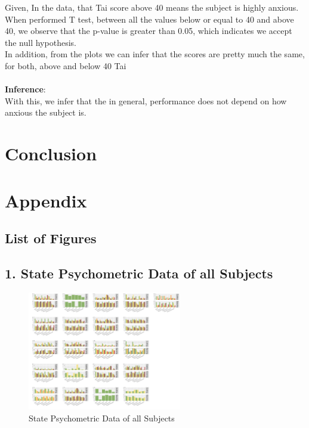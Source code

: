 \documentclass[12pt,epsf]{report}
\begin{document}
Given, In the data, that Tai score above 40 means the subject is highly anxious. When performed T test, between all the values below or equal to 40 and above 40, we observe that the p-value is greater than 0.05, which indicates we accept the null hypothesis.\\
In addition, from the plots we can infer that the scores are pretty much the same, for both, above and below 40 Tai\\
\\
\textbf{Inference}:\\
With this, we infer that the in general, performance does not depend on how anxious the subject is.
\FloatBarrier
\section*{Conclusion}



\newpage
\section*{Appendix}
\subsection*{List of Figures}
\subsection*{1. State Psychometric Data of all Subjects}
\begin{figure}[!htb]
	\centering
	\includegraphics[width=0.6\textwidth]{multiplot_state_psycho.pdf}
	\caption{State Psychometric Data of all Subjects}
	\centering
\end{figure}
\FloatBarrier
\end{document}

